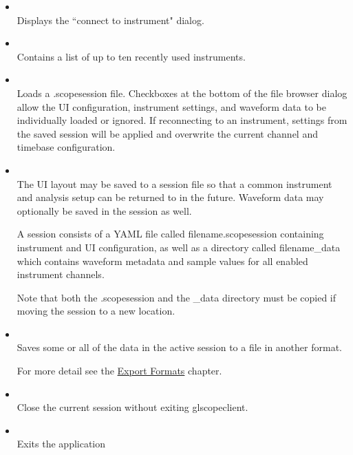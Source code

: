 \begin{itemize}
\item {}\\
Displays the ``connect to instrument" dialog.

\item {}\\
Contains a list of up to ten recently used instruments.

\item {}\\
Loads a .scopesession file. Checkboxes at the bottom of the file browser dialog allow the UI configuration, instrument
settings, and waveform data to be individually loaded or ignored. If reconnecting to an instrument, settings from the
saved session will be applied and overwrite the current channel and timebase configuration.

\item {}\\
The UI layout may be saved to a session file so that a common instrument and analysis setup can be returned to in the
future. Waveform data may optionally be saved in the session as well.

A session consists of a YAML file called filename.scopesession containing instrument and UI configuration, as well
as a directory called filename\_data which contains waveform metadata and sample values for all enabled instrument
channels.

Note that both the .scopesession and the \_data directory must be copied if moving the session to a new location.

\item {}\\

Saves some or all of the data in the active session to a file in another format.

For more detail see the \hyperref[chap:exports]{Export Formats} chapter.

\item {}\\
Close the current session without exiting glscopeclient.

\item {}\\
Exits the application

\end{itemize}


